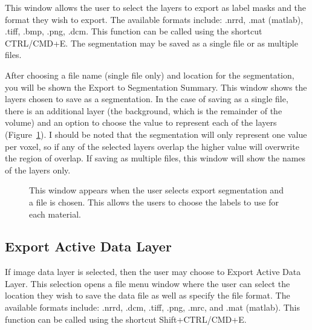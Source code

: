 \documentclass[fleqn,11pt,openany]{book}
\begin{document}
This window allows the user to select the layers to export as label masks and the format they wish to export.  The available formats include: .nrrd, .mat (matlab), .tiff, .bmp, .png, .dcm. This function can be called using the shortcut CTRL/CMD+E.  The segmentation may be saved as a single file or as multiple files.  

After choosing a file name (single file only) and location for the segmentation, you will be shown the Export to Segmentation Summary.  This window shows the layers chosen to save as a segmentation.  In the case of saving as a single file,  there is an additional layer (the background, which is the remainder of the volume)  and an option to choose the value to represent each of the layers (Figure~\ref{fig:ExportSeg_2}).  I should be noted that the segmentation will only represent one value per voxel, so if any of the selected layers overlap the higher value will overwrite the region of overlap.  If saving as multiple files, this window will show the names of the layers only.  

\begin{figure}[h!]
\caption{This window appears when the user selects export segmentation and a file is chosen.  This allows the users to choose the labels to use for each material.  }\label{fig:ExportSeg_2}
\end{figure}

\subsection{Export Active Data Layer}

If image data layer is selected, then the user may choose to Export Active Data Layer. This selection opens a file menu window where the user can select the location they wish to save the data file as well as specify the file format.  The available formats include: .nrrd, .dcm, .tiff, .png, .mrc, and .mat (matlab). This function can be called using the shortcut Shift+CTRL/CMD+E.
\end{document}
